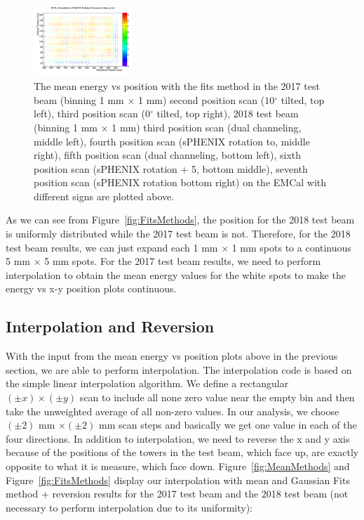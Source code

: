 \documentclass[hidelinks,11pt]{article}
\numberwithin{figure}{section}
\numberwithin{table}{section}
\newcommand{\degree}{\mbox{$^\circ$}\xspace}
\begin{document}
\begin{figure}[hbtp]
\begin{center}
\includegraphics[width=0.33\textwidth]{Plots/EnpoFitsMethod/EnPo20187thScan.png}
\caption{The mean energy vs position with the fits method in the 2017 test beam (binning 1 mm $\times$ 1 mm) second position scan ($10 \degree$ tilted, top left), third position scan ($0 \degree$ tilted, top right), 2018 test beam (binning 1 mm $\times$ 1 mm)  third position scan (dual channeling, middle left), fourth position scan (sPHENIX rotation to, middle right), fifth position scan (dual channeling, bottom left), sixth position scan (sPHENIX rotation + 5, bottom middle),  seventh position scan (sPHENIX rotation bottom right) on the EMCal with different signs are plotted above.}
\label{fig:FitsMethod}
\end{center}
\end{figure} 

As we can see from Figure~\ref{fig:FitsMethods}, the position for the 2018 test beam is uniformly distributed while the 2017 test beam is not. Therefore, for the 2018 test beam results, we can just expand each 1 mm $\times$ 1 mm spots to a continuous 5 mm $\times$ 5 mm spots. For the 2017 test beam results, we need to perform interpolation to obtain the mean energy values for the white spots to make the energy vs x-y position plots continuous. 

\subsection{Interpolation and Reversion}

\noindent With the input from the mean energy vs position plots above in the previous section, we are able to perform interpolation. The interpolation code is based on the simple linear interpolation algorithm. We define a rectangular $(\pm x) \times (\pm y)$ scan to include all none zero value near the empty bin and then take the unweighted average of all non-zero values. In our analysis, we choose $(\pm 2)$ mm $ \times (\pm 2)$ mm scan steps and basically we get one value in each of the four directions. In addition to interpolation, we need to reverse the x and y axis because of the positions of the towers in the test beam, which face up, are exactly opposite to what it is measure, which face down. Figure~\ref{fig:MeanMethods} and Figure~\ref{fig:FitsMethods} display our interpolation with mean and Gaussian Fits method + reversion results for the 2017 test beam and the 2018 test beam (not necessary to perform interpolation due to its uniformity):
\end{document}
